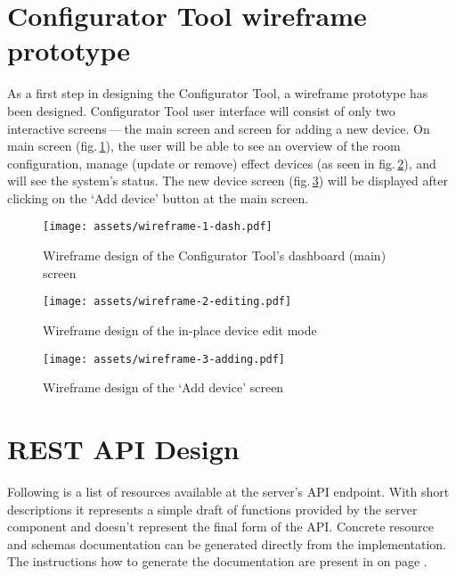 \hypertarget{x-configurator-tool-wireframe-prototype}{\section{Configurator Tool wireframe prototype}}
As a first step in designing the Configurator Tool, a wireframe prototype
has been designed. Configurator Tool user interface will consist of only
two interactive screens — the main screen and screen for adding a new device.
On main screen (fig.\,\ref{wire1}), the user will be able to see an overview of the room configuration,
manage (update or remove) effect devices (as seen in fig.\,\ref{wire2}), and will see the system’s status.
The new device screen (fig.\,\ref{wire3}) will be displayed after clicking on the `Add device'
button at the main screen.


\begin{figure}[p]{}
\centering\texttt{[image: assets/wireframe-1-dash.pdf]}
\caption{Wireframe design of the Configurator Tool's dashboard (main) screen}
\label{wire1}
\end{figure}

\begin{figure}[p]{}
\centering\texttt{[image: assets/wireframe-2-editing.pdf]}
\caption{Wireframe design of the in-place device edit mode}
\label{wire2}
\end{figure}

\begin{figure}[p]{}
\centering\texttt{[image: assets/wireframe-3-adding.pdf]}
\caption{Wireframe design of the `Add device' screen}
\label{wire3}
\end{figure}

\pagebreak


\hypertarget{x-rest-api-design}{\section{REST API Design}}
Following is a list of resources available at the server’s API endpoint.
With short descriptions it represents a simple draft of functions provided 
by the server component and doesn't represent the final form of the API.
Concrete resource and schemas documentation can be generated directly
from the implementation. The instructions how to generate the documentation
are present in  on page \pageref{devguide}.


